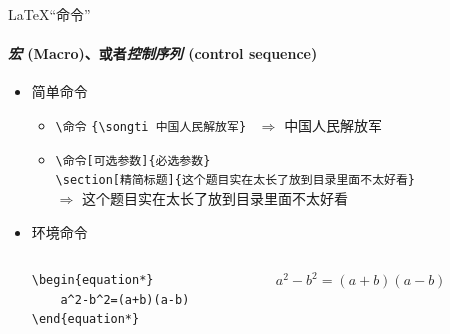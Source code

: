\begin{frame}[fragile]{\LaTeX“命令”}
    \framesubtitle{\emph{宏} (Macro)、或者\emph{控制序列} (control sequence)}
    \begin{itemize}
        \item 简单命令
            \begin{itemize}
                \item \verb|\命令|\hspace{2em}
                    \verb|{\songti 中国人民解放军}| ~$\Rightarrow$ {\songti 中国人民解放军}
                \item \verb|\命令[可选参数]{必选参数}|\\
                    \verb|\section[精简标题]{这个题目实在太长了放到目录里面不太好看}|\\
                    $\Rightarrow$ { \hspace{1em} \songti 这个题目实在太长了放到目录里面不太好看}
            \end{itemize}
        \item 环境命令
            \begin{columns}[c]
                \begin{column}{0.45\textwidth}
                    \begin{lstlisting}[basicstyle=\ttfamily]
\begin{equation*}
    a^2-b^2=(a+b)(a-b)
\end{equation*}\end{lstlisting}
                \end{column}
                \hspace{1em}
                \begin{column}{0.45\textwidth}
                    $ a^2-b^2=(a+b)(a-b)$
                \end{column}
            \end{columns}
    \end{itemize}
\end{frame}

